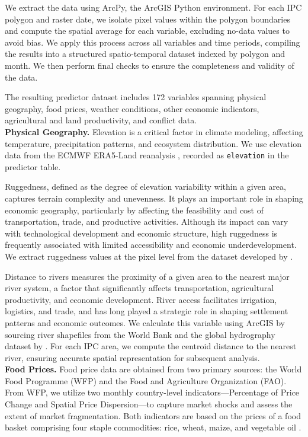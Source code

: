 \documentclass[pdflatex,sn-mathphys-num]{sn-jnl}%
\theoremstyle{thmstyleone}%
\theoremstyle{thmstyletwo}%
\theoremstyle{thmstylethree}%
\begin{document}
We extract the data using ArcPy, the ArcGIS Python environment. For each IPC polygon and raster date, we isolate pixel values within the polygon boundaries and compute the spatial average for each variable, excluding no-data values to avoid bias. We apply this process across all variables and time periods, compiling the results into a structured spatio-temporal dataset indexed by polygon and month. We then perform final checks to ensure the completeness and validity of the data.

The resulting predictor dataset includes 172 variables spanning physical geography, food prices, weather conditions, other economic indicators, agricultural and land productivity, and conflict data. \\


\noindent\textbf{Physical Geography.}
Elevation is a critical factor in climate modeling, affecting temperature, precipitation patterns, and ecosystem distribution. We use elevation data from the ECMWF ERA5-Land reanalysis \cite{ECMWF_ERA5Land}, recorded as \texttt{elevation} in the predictor table.

Ruggedness, defined as the degree of elevation variability within a given area, captures terrain complexity and unevenness. It plays an important role in shaping economic geography, particularly by affecting the feasibility and cost of transportation, trade, and productive activities. Although its impact can vary with technological development and economic structure, high ruggedness is frequently associated with limited accessibility and economic underdevelopment. We extract ruggedness values at the pixel level from the dataset developed by \cite{nunn2012ruggedness}. 

Distance to rivers measures the proximity of a given area to the nearest major river system, a factor that significantly affects transportation, agricultural productivity, and economic development. River access facilitates irrigation, logistics, and trade, and has long played a strategic role in shaping settlement patterns and economic outcomes. We calculate this variable using ArcGIS by sourcing river shapefiles from the World Bank and the global hydrography dataset by \cite{andreadis2013simple}. For each IPC area, we compute the centroid distance to the nearest river, ensuring accurate spatial representation for subsequent analysis.\\

\noindent\textbf{Food Prices.}
Food price data are obtained from two primary sources: the World Food Programme (WFP) and the Food and Agriculture Organization (FAO). From WFP, we utilize two monthly country-level indicators—Percentage of Price Change and Spatial Price Dispersion—to capture market shocks and assess the extent of market fragmentation. Both indicators are based on the prices of a food basket comprising four staple commodities: rice, wheat, maize, and vegetable oil \cite{WFP2024}.
\end{document}
